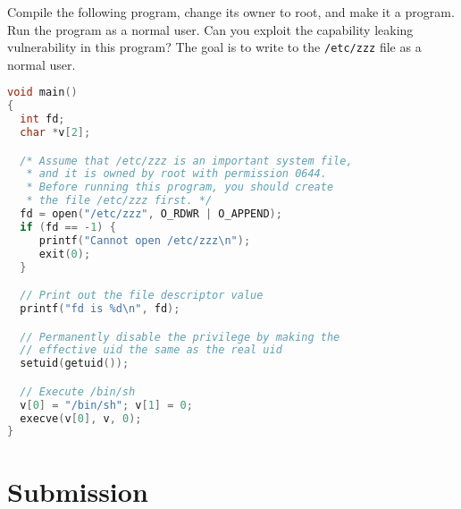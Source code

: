 Compile the following program, change its owner to root, and
make it a \setuid program. Run the program as a normal user.
Can you exploit the capability leaking vulnerability in this program?
The goal is to write to the {\tt /etc/zzz} file as a normal user.

\begin{lstlisting}[language=C, caption=\texttt{cap\_leak.c}]
void main()
{
  int fd;
  char *v[2];

  /* Assume that /etc/zzz is an important system file,
   * and it is owned by root with permission 0644.
   * Before running this program, you should create
   * the file /etc/zzz first. */
  fd = open("/etc/zzz", O_RDWR | O_APPEND);
  if (fd == -1) {
     printf("Cannot open /etc/zzz\n");
     exit(0);
  }

  // Print out the file descriptor value
  printf("fd is %d\n", fd);

  // Permanently disable the privilege by making the
  // effective uid the same as the real uid
  setuid(getuid());

  // Execute /bin/sh
  v[0] = "/bin/sh"; v[1] = 0;
  execve(v[0], v, 0);
}
\end{lstlisting}



\section{Submission}





